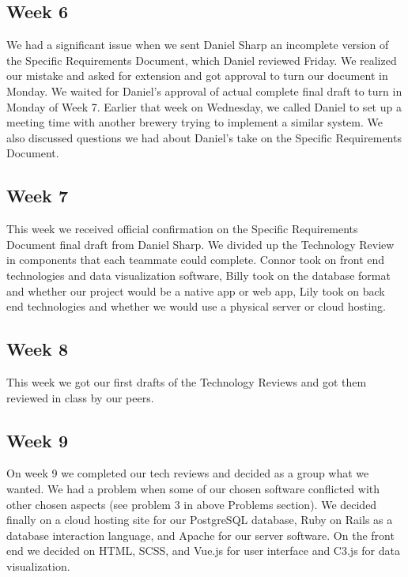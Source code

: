 \documentclass[draftclsnofoot,onecolumn,letterpaper,10pt,compsoc]{IEEEtran}
\begin{document}
\subsection{Week 6}
We had a significant issue when we sent Daniel Sharp an incomplete version of the Specific Requirements Document, which Daniel reviewed Friday.
We realized our mistake and asked for extension and got approval to turn our document in Monday.
We waited for Daniel’s approval of actual complete final draft to turn in Monday of Week 7.
Earlier that week on Wednesday, we called Daniel to set up a meeting time with another brewery trying to implement a similar system.
We also discussed questions we had about Daniel’s take on the Specific Requirements Document.

\subsection{Week 7}
This week we received official confirmation on the Specific Requirements Document final draft from Daniel Sharp.
We divided up the Technology Review in components that each teammate could complete.
Connor took on front end technologies and data visualization software, Billy took on the database format and whether our project would be a native app or web app, Lily took on back end technologies and whether we would use a physical server or cloud hosting.

\subsection{Week 8}
This week we got our first drafts of the Technology Reviews and got them reviewed in class by our peers.

\subsection{Week 9}
On week 9 we completed our tech reviews and decided as a group what we wanted.
We had a problem when some of our chosen software conflicted with other chosen aspects (see problem 3 in above Problems section).
We decided finally on a cloud hosting site for our PostgreSQL database, Ruby on Rails as a database interaction language, and Apache for our server software.
On the front end we decided on HTML, SCSS, and Vue.js for user interface and C3.js for data visualization.
\end{document}
